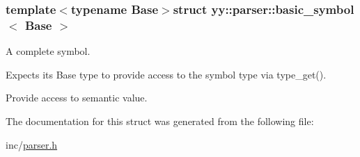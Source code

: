 \subsubsection*{template$<$typename Base$>$struct yy\+::parser\+::basic\+\_\+symbol$<$ Base $>$}

A complete symbol. 

Expects its Base type to provide access to the symbol type via type\+\_\+get().

Provide access to semantic value. 

The documentation for this struct was generated from the following file\+:\begin{DoxyCompactItemize}
\item 
inc/\hyperlink{parser_8h}{parser.\+h}\end{DoxyCompactItemize}
